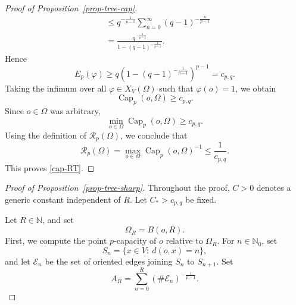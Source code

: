 \documentclass[twoside,12pt,letter]{article}
\theoremstyle{plain}
\theoremstyle{definition}
\theoremstyle{remark}
\numberwithin{equation}{section}
\begin{document}
\begin{proof}[Proof of Proposition~\ref{prop-tree-cap}]
\[\begin{aligned}
&\le
q^{-\frac{1}{p-1}}
\sum_{n=0}^{\infty}(q-1)^{-\frac{n}{p-1}}  \\
&=
\frac{q^{-\frac{1}{p-1}}}
{1-(q-1)^{-\frac{1}{p-1}}}.
\end{aligned}
\]
Hence
\[
E_p(\varphi)
\ge
q\left(1-(q-1)^{-\frac{1}{p-1}}\right)^{p-1}
=
c_{p,q}.
\]
Taking the infimum over all \(\varphi\in X_V(\Omega)\) such that
\(\varphi(o)=1\), we obtain
\[
\operatorname{Cap}_p(o,\Omega)\ge c_{p,q}.
\]
Since \(o\in\Omega\) was arbitrary,
\[
\min_{o\in\Omega}\operatorname{Cap}_p(o,\Omega)\ge c_{p,q}.
\]
Using the definition of \(\mathcal{R}_p(\Omega)\), we conclude that
\[
\mathcal{R}_p(\Omega)
=
\max_{o\in\Omega}\operatorname{Cap}_p(o,\Omega)^{-1}
\le
\frac{1}{c_{p,q}}.
\]
This proves \eqref{cap-RT}.
\end{proof}

\begin{proof}[Proof of Proposition~\ref{prop-tree-sharp}]
Throughout the proof, \(C>0\) denotes a generic constant independent of \(R\). Let \(C_*>c_{p,q}\) be fixed. 


Let \(R\in\mathbb{N}\), and set
\[
\Omega_R=B(o,R).
\]
First, we compute the point \(p\)-capacity of \(o\) relative to \(\Omega_R\).  For
\(n\in\mathbb{N}_0\), set
\[
S_n=\{x\in V:\ d(o,x)=n\},
\]
and let \(\mathcal{E}_n\) be the set of oriented edges joining \(S_n\) to
\(S_{n+1}\).  Set
\[
A_R
=
\sum_{n=0}^{R}
(\#\mathcal{E}_n)^{-\frac{1}{p-1}}.
\]


\end{proof}
\end{document}
